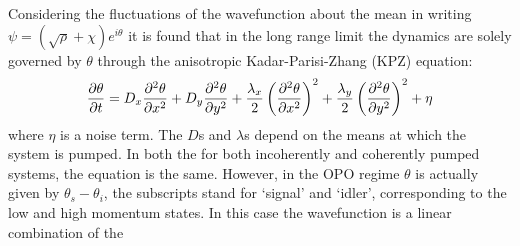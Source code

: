 \documentclass[letterpaper, 10 pt, conference]{IEEEtran}  %
\begin{document}
Considering the fluctuations of the wavefunction about the mean in writing $\psi = (\sqrt{\rho} + \chi)e^{i \theta}$ it is found that in the long range limit the dynamics are solely governed by $\theta$ through the anisotropic Kadar-Parisi-Zhang (KPZ) equation:
\[
\pdv{\theta}{t} = D_x \pdv[2]{\theta}{x} + D_y \pdv[2]{\theta}{y} + \frac{\lambda_x}{2}\left ( \pdv[2]{\theta}{x} \right)^2 + \frac{\lambda_y}{2} \left (\pdv[2]{\theta}{y} \right)^2 + \eta
\]
where $\eta$ is a noise term. 
The $D$s and $\lambda$s depend on the means at which the system is pumped. 
In both the for both incoherently and coherently pumped systems, the equation is the same. 
However, in the OPO regime $\theta$ is actually given by $\theta_s - \theta_i$, the subscripts stand for `signal' and `idler', corresponding to the low and high momentum states. 
In this case the wavefunction is a linear combination of the 
\end{document}
